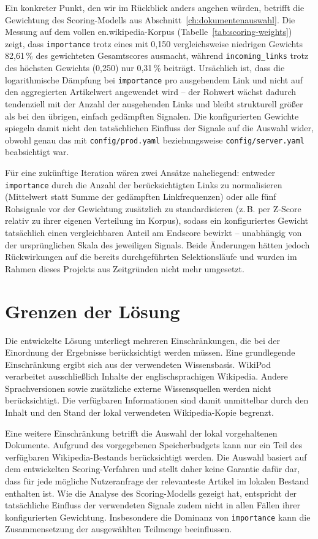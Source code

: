 Ein konkreter Punkt, den wir im Rückblick anders angehen würden, betrifft die Gewichtung des Scoring-Modells
aus Abschnitt~\ref{ch:dokumentenauswahl}. Die Messung auf dem vollen en.wikipedia-Korpus (Tabelle~\ref{tab:scoring-weights})
zeigt, dass \texttt{importance} trotz eines mit 0,150 vergleichsweise niedrigen Gewichts 82,61\,\% des
gewichteten Gesamtscores ausmacht, während \texttt{incoming\_links} trotz des höchsten Gewichts (0,250) nur
0,31\,\% beiträgt. Ursächlich ist, dass die logarithmische Dämpfung bei \texttt{importance} pro ausgehendem
Link und nicht auf den aggregierten Artikelwert angewendet wird -- der Rohwert wächst dadurch tendenziell mit
der Anzahl der ausgehenden Links und bleibt strukturell größer als bei den übrigen, einfach gedämpften
Signalen. Die konfigurierten Gewichte spiegeln damit nicht den tatsächlichen Einfluss der Signale auf die
Auswahl wider, obwohl genau das mit \texttt{config/prod.yaml} beziehungsweise \texttt{config/server.yaml}
beabsichtigt war.

Für eine zukünftige Iteration wären zwei Ansätze naheliegend: entweder \texttt{importance} durch die Anzahl
der berücksichtigten Links zu normalisieren (Mittelwert statt Summe der gedämpften Linkfrequenzen) oder alle
fünf Rohsignale vor der Gewichtung zusätzlich zu standardisieren (z.\,B. per Z-Score relativ zu ihrer eigenen
Verteilung im Korpus), sodass ein konfiguriertes Gewicht tatsächlich einen vergleichbaren Anteil am Endscore
bewirkt -- unabhängig von der ursprünglichen Skala des jeweiligen Signals. Beide Änderungen hätten jedoch
Rückwirkungen auf die bereits durchgeführten Selektionsläufe und wurden im Rahmen dieses Projekts aus
Zeitgründen nicht mehr umgesetzt.

\section{Grenzen der Lösung}

Die entwickelte Lösung unterliegt mehreren Einschränkungen, die bei der
Einordnung der Ergebnisse berücksichtigt werden müssen. Eine grundlegende
Einschränkung ergibt sich aus der verwendeten Wissensbasis. WikiPod verarbeitet
ausschließlich Inhalte der englischsprachigen Wikipedia. Andere Sprachversionen
sowie zusätzliche externe Wissensquellen werden nicht berücksichtigt. Die
verfügbaren Informationen sind damit unmittelbar durch den Inhalt und den
Stand der lokal verwendeten Wikipedia-Kopie begrenzt.

Eine weitere Einschränkung betrifft die Auswahl der lokal vorgehaltenen
Dokumente. Aufgrund des vorgegebenen Speicherbudgets kann nur ein Teil des
verfügbaren Wikipedia-Bestands berücksichtigt werden. Die Auswahl basiert auf
dem entwickelten Scoring-Verfahren und stellt daher keine Garantie dafür dar,
dass für jede mögliche Nutzeranfrage der relevanteste Artikel im lokalen
Bestand enthalten ist. Wie die Analyse des Scoring-Modells gezeigt hat,
entspricht der tatsächliche Einfluss der verwendeten Signale zudem nicht in
allen Fällen ihrer konfigurierten Gewichtung. Insbesondere die Dominanz von
\texttt{importance} kann die Zusammensetzung der ausgewählten Teilmenge
beeinflussen.


